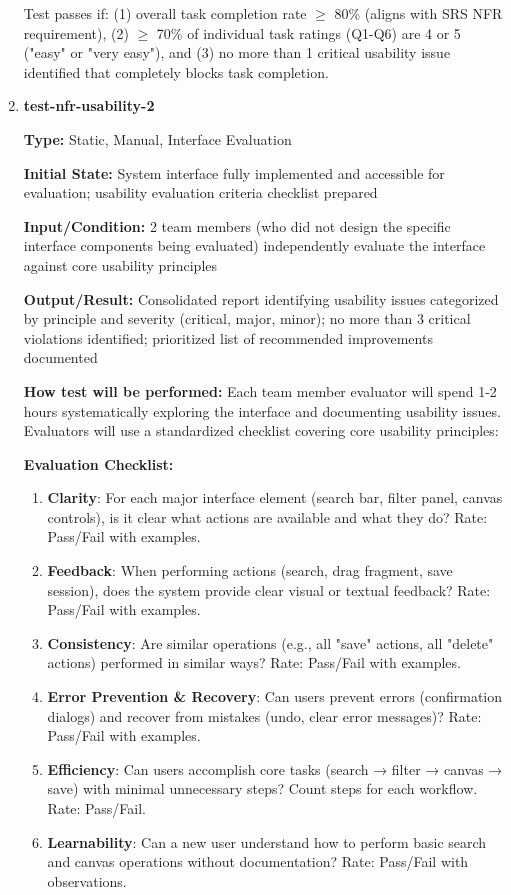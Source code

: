 \documentclass[12pt, titlepage]{article}
\begin{document}
\begin{enumerate}
Test passes if: (1) overall task completion rate $\geq$ 80\% (aligns with SRS NFR requirement), (2) $\geq$ 70\% of individual task ratings (Q1-Q6) are 4 or 5 ("easy" or "very easy"), and (3) no more than 1 critical usability issue identified that completely blocks task completion.

\item \textbf{test-nfr-usability-2}

\textbf{Type:} Static, Manual, Interface Evaluation

\textbf{Initial State:} System interface fully implemented and accessible for evaluation; usability evaluation criteria checklist prepared

\textbf{Input/Condition:} 2 team members (who did not design the specific interface components being evaluated) independently evaluate the interface against core usability principles

\textbf{Output/Result:} Consolidated report identifying usability issues categorized by principle and severity (critical, major, minor); no more than 3 critical violations identified; prioritized list of recommended improvements documented

\textbf{How test will be performed:} Each team member evaluator will spend 1-2 hours systematically exploring the interface and documenting usability issues. Evaluators will use a standardized checklist covering core usability principles:

\textbf{Evaluation Checklist:}
\begin{enumerate}
\item \textbf{Clarity}: For each major interface element (search bar, filter panel, canvas controls), is it clear what actions are available and what they do? Rate: Pass/Fail with examples.
\item \textbf{Feedback}: When performing actions (search, drag fragment, save session), does the system provide clear visual or textual feedback? Rate: Pass/Fail with examples.
\item \textbf{Consistency}: Are similar operations (e.g., all "save" actions, all "delete" actions) performed in similar ways? Rate: Pass/Fail with examples.
\item \textbf{Error Prevention \& Recovery}: Can users prevent errors (confirmation dialogs) and recover from mistakes (undo, clear error messages)? Rate: Pass/Fail with examples.
\item \textbf{Efficiency}: Can users accomplish core tasks (search → filter → canvas → save) with minimal unnecessary steps? Count steps for each workflow. Rate: Pass/Fail.
\item \textbf{Learnability}: Can a new user understand how to perform basic search and canvas operations without documentation? Rate: Pass/Fail with observations.
\end{enumerate}


\end{enumerate}
\end{document}
